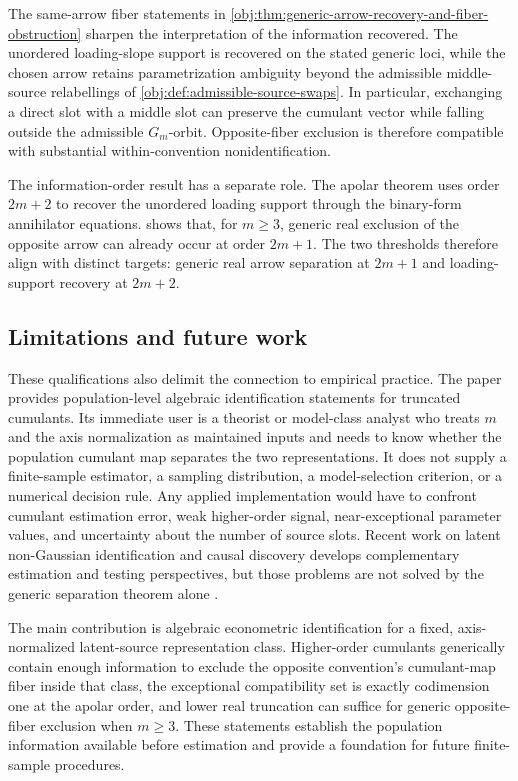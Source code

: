 The same-arrow fiber statements in \cref{obj:thm:generic-arrow-recovery-and-fiber-obstruction} sharpen the interpretation of the information recovered. The unordered loading-slope support is recovered on the stated generic loci, while the chosen arrow retains parametrization ambiguity beyond the admissible middle-source relabellings of \cref{obj:def:admissible-source-swaps}. In particular, exchanging a direct slot with a middle slot can preserve the cumulant vector while falling outside the admissible \(G_m\)-orbit. Opposite-fiber exclusion is therefore compatible with substantial within-convention nonidentification.

The information-order result has a separate role. The apolar theorem uses order \(2m+2\) to recover the unordered loading support through the binary-form annihilator equations.  shows that, for \(m\ge3\), generic real exclusion of the opposite arrow can already occur at order \(2m+1\). The two thresholds therefore align with distinct targets: generic real arrow separation at \(2m+1\) and loading-support recovery at \(2m+2\).

\subsection{Limitations and future work}

These qualifications also delimit the connection to empirical practice. The paper provides population-level algebraic identification statements for truncated cumulants. Its immediate user is a theorist or model-class analyst who treats \(m\) and the axis normalization as maintained inputs and needs to know whether the population cumulant map separates the two representations. It does not supply a finite-sample estimator, a sampling distribution, a model-selection criterion, or a numerical decision rule. Any applied implementation would have to confront cumulant estimation error, weak higher-order signal, near-exceptional parameter values, and uncertainty about the number of source slots. Recent work on latent non-Gaussian identification and causal discovery develops complementary estimation and testing perspectives, but those problems are not solved by the generic separation theorem alone \citep{XieHuangChenEtAl2023,MorinishiShimizu2025,ChenGuPengEtAl2025}.

The main contribution is algebraic econometric identification for a fixed, axis-normalized latent-source representation class. Higher-order cumulants generically contain enough information to exclude the opposite convention's cumulant-map fiber inside that class, the exceptional compatibility set is exactly codimension one at the apolar order, and lower real truncation can suffice for generic opposite-fiber exclusion when \(m\ge3\). These statements establish the population information available before estimation and provide a foundation for future finite-sample procedures.
